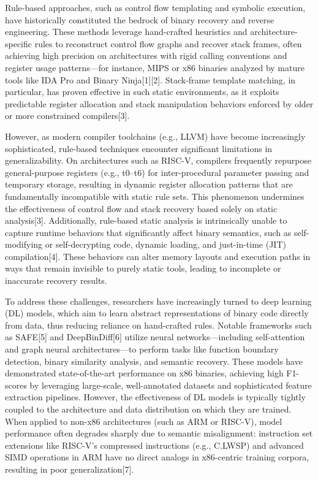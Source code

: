 \documentclass[acmsmall,screen,review,anonymous]{acmart} %
\begin{document}
Rule-based approaches, such as control flow templating and symbolic execution, have historically constituted the bedrock of binary recovery and reverse engineering. These methods leverage hand-crafted heuristics and architecture-specific rules to reconstruct control flow graphs and recover stack frames, often achieving high precision on architectures with rigid calling conventions and register usage patterns—for instance, MIPS or x86 binaries analyzed by mature tools like IDA Pro and Binary Ninja[1][2]. Stack-frame template matching, in particular, has proven effective in such static environments, as it exploits predictable register allocation and stack manipulation behaviors enforced by older or more constrained compilers[3].

However, as modern compiler toolchains (e.g., LLVM) have become increasingly sophisticated, rule-based techniques encounter significant limitations in generalizability. On architectures such as RISC-V, compilers frequently repurpose general-purpose registers (e.g., t0–t6) for inter-procedural parameter passing and temporary storage, resulting in dynamic register allocation patterns that are fundamentally incompatible with static rule sets. This phenomenon undermines the effectiveness of control flow and stack recovery based solely on static analysis[3]. Additionally, rule-based static analysis is intrinsically unable to capture runtime behaviors that significantly affect binary semantics, such as self-modifying or self-decrypting code, dynamic loading, and just-in-time (JIT) compilation[4]. These behaviors can alter memory layouts and execution paths in ways that remain invisible to purely static tools, leading to incomplete or inaccurate recovery results.

To address these challenges, researchers have increasingly turned to deep learning (DL) models, which aim to learn abstract representations of binary code directly from data, thus reducing reliance on hand-crafted rules. Notable frameworks such as SAFE[5] and DeepBinDiff[6] utilize neural networks—including self-attention and graph neural architectures—to perform tasks like function boundary detection, binary similarity analysis, and semantic recovery. These models have demonstrated state-of-the-art performance on x86 binaries, achieving high F1-scores by leveraging large-scale, well-annotated datasets and sophisticated feature extraction pipelines. However, the effectiveness of DL models is typically tightly coupled to the architecture and data distribution on which they are trained. When applied to non-x86 architectures (such as ARM or RISC-V), model performance often degrades sharply due to semantic misalignment: instruction set extensions like RISC-V’s compressed instructions (e.g., C.LWSP) and advanced SIMD operations in ARM have no direct analogs in x86-centric training corpora, resulting in poor generalization[7].
\end{document}

